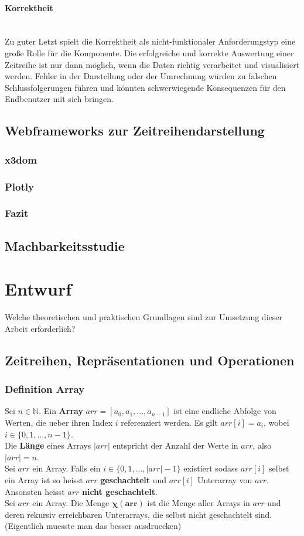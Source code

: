 \documentclass[12pt]{article}
\begin{document}
			\paragraph{Korrektheit} $\;$ \\[0.3cm]
			Zu guter Letzt spielt die Korrektheit als nicht-funktionaler Anforderungstyp
			eine große Rolle für die Komponente. Die erfolgreiche und korrekte Auswertung
			einer Zeitreihe ist nur dann möglich, wenn die Daten richtig verarbeitet
			und visualisiert werden. Fehler in der Darstellung oder der Umrechnung würden
			zu falschen Schlussfolgerungen führen und könnten schwerwiegende Konsequenzen
			für den Endbenutzer mit sich bringen.
			
			\newpage
	\subsection{Webframeworks zur Zeitreihendarstellung}
		\subsubsection{x3dom}
		\subsubsection{Plotly}

		\subsubsection{Fazit}
	\subsection{Machbarkeitsstudie}
\section{Entwurf}
		Welche theoretischen und praktischen Grundlagen sind zur Umsetzung dieser Arbeit erforderlich?
	\subsection{Zeitreihen, Repräsentationen und Operationen}
		\subsubsection{Definition Array}
		Sei $n \in \mathbb{N}$. Ein \textbf{Array} $arr = [a_{0}, a_{1}, ..., a_{n-1}]$ ist eine endliche Abfolge von Werten, die ueber ihren Index $i$ referenziert werden. Es gilt $arr[i] = a_{i}$, wobei $i \in \{0,1, ..., n-1\}$. \\[0.2cm]
		Die \textbf{Länge} eines Arrays $|arr|$ entspricht der Anzahl der Werte in $arr$, also $|arr| = n$.\\[0.4cm]
		Sei $arr$ ein Array. Falls ein $i \in \{0,1, ..., |arr| - 1\}$ existiert sodass $arr[i]$ selbst ein Array ist so heisst $arr$ \textbf{geschachtelt} und $arr[i]$ Unterarray von $arr$. Ansonsten heisst $arr$ \textbf{nicht geschachtelt}.\\[0.4cm]
		Sei $arr$ ein Array. Die Menge $\boldsymbol{\chi(arr)}$ ist die Menge aller Arrays in $arr$ und deren rekursiv erreichbaren Unterarrays, die selbst nicht geschachtelt sind. (Eigentlich muesste man das besser ausdruecken)
\end{document}
